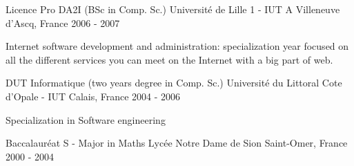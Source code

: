 


\begin{cventries}

\cventry
{Licence Pro DA2I (BSc in Comp. Sc.)} %
{Université de Lille 1 - IUT A} %
{Villeneuve d'Ascq, France} %
{2006 - 2007} %
{ %
\begin{cvitems}
\item {Internet software development and administration: specialization year focused on all the different services you can meet on the Internet with a big part of web.}
\end{cvitems}
}

\cventry
{DUT Informatique (two years degree in Comp. Sc.)} %
{Université du Littoral Cote d'Opale - IUT } %
{Calais, France} %
{2004 - 2006} %
{ %
\begin{cvitems}
\item {Specialization in Software engineering}
\end{cvitems}
}

\cventry
{Baccalauréat S - Major in Maths} %
{Lycée Notre Dame de Sion} %
{Saint-Omer, France} %
{2000 - 2004} %
{ %
\begin{cvitems}
\end{cvitems}
}
\end{cventries}